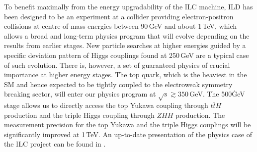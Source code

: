 To benefit maximally from the energy upgradability of the ILC machine, ILD has been designed to be an experiment at a collider providing electron-positron collisions at centre-of-mass energies between 90\,GeV and about 1\,TeV, which allows a broad and long-term physics program that will evolve depending on the results from earlier stages. New particle searches at higher energies guided by a specific deviation pattern of Higgs couplings found at 250\,GeV are a typical case of such evolution. There is, however, a set of guaranteed physics of crucial importance at higher energy stages. The top quark, which is the heaviest in the SM and hence expected to be tightly coupled to the electroweak symmetry breaking sector, will enter our physics program at $\sqrt{s} \gtrsim 350$\,GeV. The 500\.GeV stage allows us to directly access the top Yukawa coupling through $t\bar{t}H$ production and the triple Higgs coupling through $ZHH$ production. The measurement precision for the top Yukawa and the triple Higgs couplings will be significantly improved at 1\,TeV. An up-to-date presentation of the physics case of the ILC project can be found in
\cite{ILCESU1}.
%
